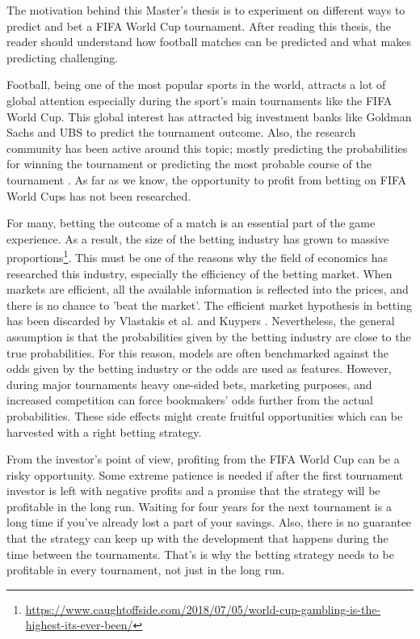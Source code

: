 

The motivation behind this Master's thesis is to experiment on different ways to predict and bet a FIFA World Cup tournament. After reading this thesis, the reader should understand how football matches can be predicted and what makes predicting challenging.

Football, being one of the most popular sports in the world, attracts a lot of global attention especially during the sport's main tournaments like the FIFA World Cup. This global interest has attracted big investment banks like Goldman Sachs and UBS to predict the tournament outcome. Also, the research community has been active around this topic; mostly predicting the probabilities for winning the tournament or predicting the most probable course of the tournament \cite{groll2018prediction, groll2015prediction, leitner2010forecasting}. As far as we know, the opportunity to profit from betting on FIFA World Cups has not been researched.

For many, betting the outcome of a match is an essential part of the game experience. As a result, the size of the betting industry has grown to massive proportions\footnote{\url{https://www.caughtoffside.com/2018/07/05/world-cup-gambling-is-the-highest-its-ever-been/}}. This must be one of the reasons why the field of economics has researched this industry, especially the efficiency of the betting market. When markets are efficient, all the available information is reflected into the prices, and there is no chance to 'beat the market'. The efficient market hypothesis in betting has been discarded by Vlastakis et al. \cite{vlastakis2009efficient} and Kuypers \cite{kuypers2008}. Nevertheless, the general assumption is that the probabilities given by the betting industry are close to the true probabilities. For this reason, models are often benchmarked against the odds given by the betting industry or the odds are used as features. \cite{leitner2010forecasting} However, during major tournaments heavy one-sided bets, marketing purposes, and increased competition can force bookmakers' odds further from the actual probabilities. These side effects might create fruitful opportunities which can be harvested with a right betting strategy.

From the investor's point of view, profiting from the FIFA World Cup can be a risky opportunity. Some extreme patience is needed if after the first tournament investor is left with negative profits and a promise that the strategy will be profitable in the long run. Waiting for four years for the next tournament is a long time if you've already lost a part of your savings. Also, there is no guarantee that the strategy can keep up with the development that happens during the time between the tournaments. That's is why the betting strategy needs to be profitable in every tournament, not just in the long run.

